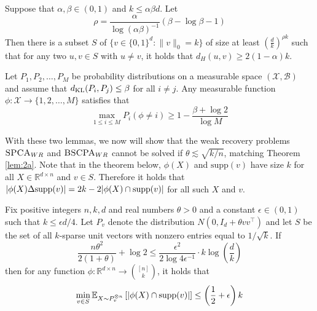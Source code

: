 \begin{lemma}
Suppose that $\alpha, \beta \in (0, 1)$ and $k \le \alpha \beta d$. Let
$$\rho = \frac{\alpha}{\log(\alpha \beta)^{-1}}\left( \beta - \log \beta - 1 \right)$$
Then there is a subset $S$ of $\{ v \in \{0, 1\}^d : \| v \|_0 = k \}$ of size at least $\left( \frac{d}{k} \right)^{\rho k}$ such that for any two $u, v \in S$ with $u \neq v$, it holds that $d_H(u, v) \ge 2(1 - \alpha)k$. 
\end{lemma}

\begin{lemma}
Let $P_1, P_2, \dots, P_M$ be probability distributions on a measurable space $(\mathcal{X}, \mathcal{B})$ and assume that $d_{\text{KL}}(P_i, P_j) \le \beta$ for all $i \neq j$. Any measurable function $\phi : \mathcal{X} \to \{1, 2, \dots, M\}$ satisfies that
$$\max_{1 \le i \le M} P_i(\phi \neq i) \ge 1 - \frac{\beta + \log 2}{\log M}$$
\end{lemma}

With these two lemmas, we now will show that the weak recovery problems $\textsc{SPCA}_{WR}$ and $\textsc{BSCPA}_{WR}$ cannot be solved if $\theta \lesssim \sqrt{k/n}$, matching Theorem \ref{lem:2a}. Note that in the theorem below, $\phi(X)$ and $\text{supp}(v)$ have size $k$ for all $X \in \mathbb{R}^{d \times n}$ and $v \in S$. Therefore it holds that $|\phi(X) \Delta \textnormal{supp}(v)| = 2k - 2|\phi(X) \cap \textnormal{supp}(v)|$ for all such $X$ and $v$.

\begin{theorem}
Fix positive integers $n, k, d$ and real numbers $\theta > 0$ and a constant $\epsilon \in (0, 1)$ such that $k \le \epsilon d/4$. Let $P_v$ denote the distribution $N(0, I_d + \theta vv^\top)$ and let $S$ be the set of all $k$-sparse unit vectors with nonzero entries equal to $1/\sqrt{k}$. If
$$\frac{n\theta^2}{2(1 + \theta)} + \log 2 \le \frac{\epsilon^2}{2\log 4\epsilon^{-1}} \cdot k \log \left( \frac{d}{k} \right)$$
then for any function $\phi : \mathbb{R}^{d \times n} \to \binom{[n]}{k}$, it holds that
$$\min_{v \in S} \mathbb{E}_{X \sim P_v^{\otimes n}} \left[ |\phi(X) \cap \textnormal{supp}(v)| \right] \le \left( \frac{1}{2} + \epsilon \right) k$$
\end{theorem}

